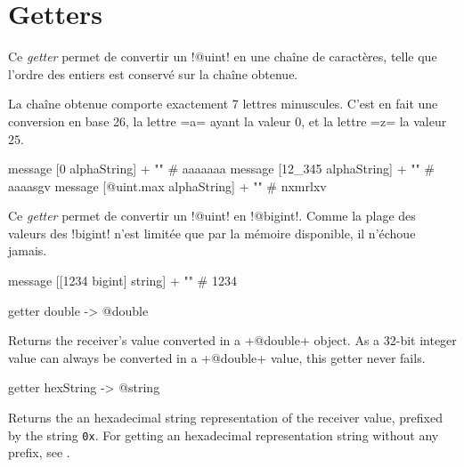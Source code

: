 \section{Getters}


Ce \emph{getter} permet de convertir un \ggst!@uint! en une chaîne de caractères, telle que l'ordre des entiers est conservé sur la chaîne obtenue.

La chaîne obtenue comporte exactement 7 lettres minuscules. C'est en fait une conversion en base 26, la lettre \ggst=a= ayant la valeur $0$, et la lettre \ggst=z= la valeur $25$.


\begin{galgas3}
  message [0 alphaString] + "\n"         # aaaaaaa
  message [12_345 alphaString] + "\n"    # aaaasgv
  message [@uint.max alphaString] + "\n" # nxmrlxv
\end{galgas3}




Ce \emph{getter} permet de convertir un \ggst!@uint! en \ggst!@bigint!. Comme la plage des valeurs des \ggst!bigint! n'est limitée que par la mémoire disponible, il n'échoue jamais.

\begin{galgas3}
  message [[1234 bigint] string] + "\n" # 1234
\end{galgas3}



\begin{galgas3}
getter double -> @double
\end{galgas3}

Returns the receiver's value converted in a \ggst+@double+ object. As a 32-bit integer value can always be converted in a \ggst+@double+ value, this getter never fails.




\begin{galgas3}
getter hexString -> @string
\end{galgas3}

Returns the an hexadecimal string representation of the receiver value, prefixed by the string \texttt{0x}. For getting an hexadecimal representation string without any prefix, see .




